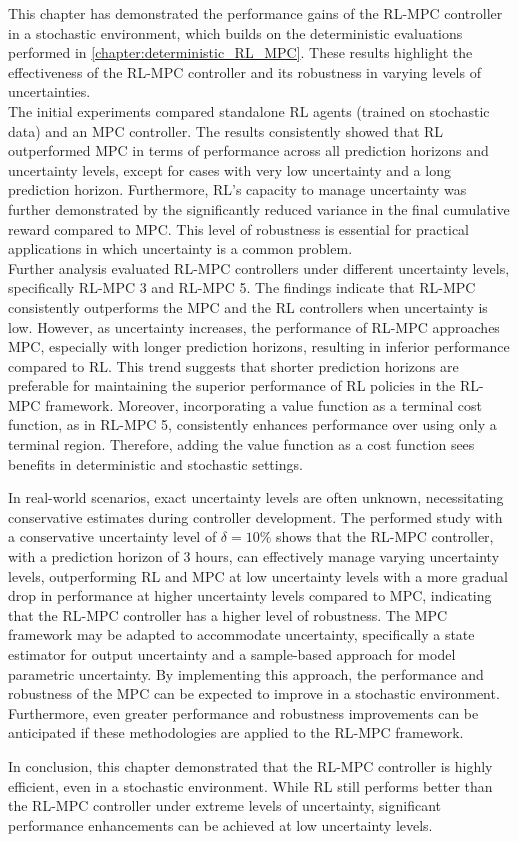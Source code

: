 This chapter has demonstrated the performance gains of the RL-MPC controller in a stochastic environment, which builds on the deterministic evaluations performed in \autoref{chapter:deterministic_RL_MPC}. These results highlight the effectiveness of the RL-MPC controller and its robustness in varying levels of uncertainties. \\
The initial experiments compared standalone RL agents (trained on stochastic data) and an MPC controller. The results consistently showed that RL outperformed MPC in terms of performance across all prediction horizons and uncertainty levels, except for cases with very low uncertainty and a long prediction horizon. Furthermore, RL’s capacity to manage uncertainty was further demonstrated by the significantly reduced variance in the final cumulative reward compared to MPC. This level of robustness is essential for practical applications in which uncertainty is a common problem.\\
Further analysis evaluated RL-MPC controllers under different uncertainty levels, specifically RL-MPC 3 and RL-MPC 5. The findings indicate that RL-MPC consistently outperforms the MPC and the RL controllers when uncertainty is low. However, as uncertainty increases, the performance of RL-MPC approaches MPC, especially with longer prediction horizons, resulting in inferior performance compared to RL. This trend suggests that shorter prediction horizons are preferable for maintaining the superior performance of RL policies in the RL-MPC framework. Moreover, incorporating a value function as a terminal cost function, as in RL-MPC 5, consistently enhances performance over using only a terminal region. Therefore, adding the value function as a cost function sees benefits in deterministic and stochastic settings.

In real-world scenarios, exact uncertainty levels are often unknown, necessitating conservative estimates during controller development. The performed study with a conservative uncertainty level of $\delta = 10\%$ shows that the RL-MPC controller, with a prediction horizon of 3 hours, can effectively manage varying uncertainty levels, outperforming RL and MPC at low uncertainty levels with a more gradual drop in performance at higher uncertainty levels compared to MPC, indicating that the RL-MPC controller has a higher level of robustness. The MPC framework may be adapted to accommodate uncertainty, specifically a state estimator for output uncertainty and a sample-based approach for model parametric uncertainty. By implementing this approach, the performance and robustness of the MPC can be expected to improve in a stochastic environment. Furthermore, even greater performance and robustness improvements can be anticipated if these methodologies are applied to the RL-MPC framework.

In conclusion, this chapter demonstrated that the RL-MPC controller is highly efficient, even in a stochastic environment. While RL still performs better than the RL-MPC controller under extreme levels of uncertainty, significant performance enhancements can be achieved at low uncertainty levels.

